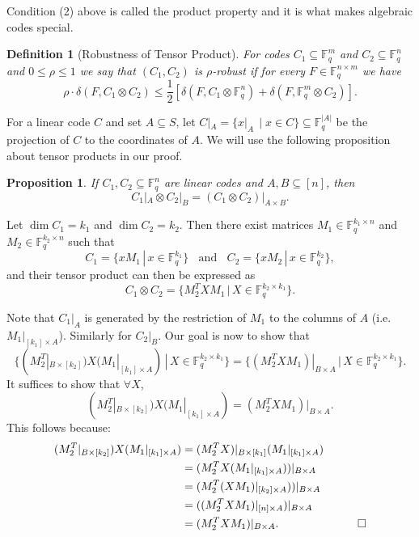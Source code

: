 \documentclass[11pt]{article}
\newcommand{\F}{\mathbb{F}}
\newtheorem{prop}[theorem]{Proposition}
\newtheorem{definition}[theorem]{Definition}
\begin{document}
Condition (2) above is called the product property and it is what makes algebraic codes special.

\begin{definition}[Robustness of Tensor Product]\label{def:robust} For codes $C_1 \subseteq \F_q^m$ and $C_2 \subseteq \F_q^n$ and $0 \leq \rho \leq 1$ we say that $(C_1,C_2)$ is $\rho$-robust
if for every $F\in \F_q^{n \times m}$ we have 
$$ \rho \cdot \delta(F,C_1 \otimes C_2) \leq \frac12[\delta(F,C_1 \otimes \F_q^n) + \delta(F,\F_q^m \otimes C_2)].$$
\end{definition}

For a linear code $C$ and set $A \subseteq S$, let $C|_A = \{x|_{A} \,\mid  x \in C\} \subseteq \F_q^{|A|}$ be the projection of $C$ to the coordinates of $A$. We will use the following proposition about tensor products in our proof. 
\begin{prop}
\label{tensor_restrict}
    If $C_1, C_2 \subseteq \F_q^n$ are linear codes and $A, B \subseteq [n]$, then 
    \[C_1|_A \otimes C_2|_B = (C_1 \otimes C_2)|_{A \times B}.\]
\end{prop}

\proof
    Let $\dim C_1 = k_1$ and $\dim C_2 = k_2$. Then there exist matrices $M_1 \in \F_q^{k_1 \times n}$ and $M_2 \in \F_q^{k_2 \times n}$ such that
    $$C_1 = \{xM_1 \,|\, x \in \F_q^{k_1}\} \;\;\text{ and }\;\; C_2 = \{xM_2 \,|\, x \in \F_q^{k_2}\},$$
  and their tensor product can then be expressed as
    $$C_1 \otimes C_2 = \{M_2^T X M_1 \,|\, X \in \F_q^{k_2 \times k_1}\}.$$

    Note that $C_1|_A$ is generated by the restriction of $M_1$ to the columns of $A$ (i.e. $M_1 |_{[k_1] \times A}$). Similarly for $C_2|_B$. Our goal is now to show that
    $$\{(M_2^T|_{B \times [k_2]}) X (M_1|_{[k_1] \times A}) \,|\, X \in \F_q^{k_2 \times k_1}\} = \{(M_2^T X M_1)|_{B \times A} \,|\, X \in \F_q^{k_2 \times k_1}\}.$$
    It suffices to show that $\forall X$,
    $$(M_2^T|_{B \times [k_2]}) X (M_1|_{[k_1] \times A}) = (M_2^T X M_1)|_{B \times A}.$$
    This follows because:
    \begin{align*}
    (M_2^T|_{B \times [k_2]}) X (M_1|_{[k_1] \times A}) &= (M_2^T X)|_{B \times [k_1]} (M_1|_{[k_1] \times A}) \\
    &= (M_2^T X (M_1|_{[k_1] \times A}))|_{B \times A}  \\
    &= (M_2^T (X M_1)|_{[k_2] \times A}))|_{B \times A}  \\
    &= ((M_2^T X M_1)|_{[n] \times A})|_{B \times A}  \\
    &= (M_2^T X M_1)|_{B \times A}.&\qedhere
    \end{align*}
    
\end{document}
